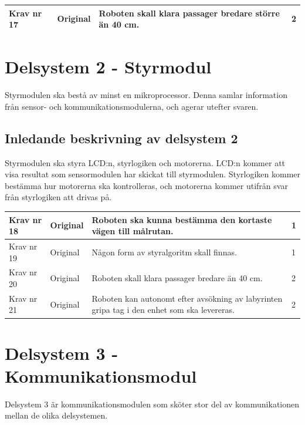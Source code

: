 \documentclass[11pt]{article}
\begin{document}
\begin{flushleft}
\begin{center}
\begin{longtable}{|l|l|p{.70\linewidth}|l|} \hline

Krav nr 17 &
Original &
Roboten skall klara passager bredare större än 40 cm. &
2 \\ \hline

\end{longtable}
\end{center}


\section{Delsystem 2 - Styrmodul}
Styrmodulen ska bestå av minst en mikroprocessor.  Denna samlar information från sensor- och kommunikationsmodulerna, och agerar utefter svaren.


\subsection{Inledande beskrivning av delsystem 2}
Styrmodulen ska styra LCD:n, styrlogiken och motorerna.
LCD:n kommer att visa resultat som sensormodulen har skickat till styrmodulen. Styrlogiken kommer bestämma hur motorerna ska kontrolleras, och motorerna kommer utifrån svar från styrlogiken att drivas på.

\begin{center}
\begin{longtable}{|l|l|p{.70\linewidth}|l|} \hline

Krav nr 18 &
Original &
Roboten ska kunna bestämma den kortaste vägen till målrutan. &
1 \\ \hline

Krav nr 19 &
Original &
Någon form av styralgoritm skall finnas. &
1 \\ \hline

Krav nr 20 &
Original &
Roboten skall klara passager bredare än 40 cm. &
2 \\ \hline

Krav nr 21 &
Original &
Roboten kan autonomt efter avsökning av labyrinten gripa tag i den enhet som ska levereras. &
2 \\ \hline

\end{longtable}
\end{center}


\pagebreak

\section{Delsystem 3 - Kommunikationsmodul}
Delsystem 3 är kommunikationsmodulen som sköter stor del av kommunikationen mellan de olika delsystemen. 
\begin{center}
\begin{longtable}{|l|l|p{.70\linewidth}|l|} \hline


\end{longtable}
\end{center}
\end{flushleft}
\end{document}
